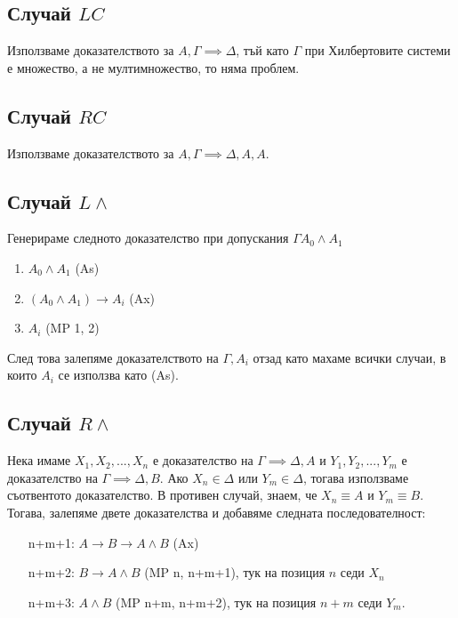 \documentclass[12pt]{article}
\begin{document}
\subsection*{Случай $LC$}
Използваме доказателството за $A, \Gamma \implies \Delta$, тъй като $\Gamma$ при Хилбертовите системи е множество, а не мултимножество, то няма проблем.

\subsection*{Случай $RC$}
Използваме доказателството за $A, \Gamma \implies \Delta, A, A$.

\subsection*{Случай $L \land$}
Генерираме следното доказателство при допускания $\Gamma A_0 \land A_1$
\begin{enumerate}
    \item $A_0 \land A_1$ (As)
    \item $(A_0 \land A_1) \rightarrow A_i$ (Ax)
    \item $A_i$ (MP 1, 2) 
\end{enumerate}
След това залепяме доказателството на $\Gamma, A_i$ отзад като махаме всички случаи, в които $A_i$ се използва като (As).

\subsection*{Случай $R \land$}
Нека имаме $X_1, X_2, ..., X_n$ е доказателство на $\Gamma \implies \Delta, A$ и $Y_1, Y_2, ..., Y_m$ е доказателство на $\Gamma \implies \Delta, B$. Ако $X_n \in \Delta$ или $Y_m \in \Delta$, тогава използваме съотвентото доказателство. В противен случай, знаем, че $X_n \equiv A$ и $Y_m \equiv B$. Тогава, залепяме двете доказателства и добавяме следната последователност:
\begin{itemize}[itemindent=4em]
    \item[n+m+1: ] $A \rightarrow B \rightarrow A \land B$ (Ax)    
    \item[n+m+2: ] $B \rightarrow A \land B$ (MP n, n+m+1), тук на позиция $n$ седи $X_n$ 
    \item[n+m+3: ] $A \land B$ (MP n+m, n+m+2), тук на позиция $n+m$ седи $Y_m$.
\end{itemize}
\end{document}
